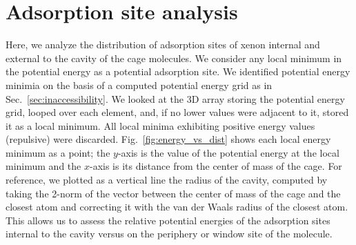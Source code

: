 \documentclass[journal=jacsat,manuscript=article]{achemso}
\begin{document}
\clearpage
\newpage


\section{Adsorption site analysis}
Here, we analyze the distribution of adsorption sites of xenon internal and external to the cavity of the cage molecules. We consider any local minimum in the potential energy as a potential adsorption site. We identified potential energy minimia on the basis of a computed potential energy grid as in Sec.~\ref{sec:inaccessibility}. We looked at the 3D array storing the potential energy grid, looped over each element, and, if no lower values were adjacent to it, stored it as a local minimum. All local minima exhibiting positive energy values (repulsive) were discarded. 
Fig.~\ref{fig:energy_vs_dist} shows each local energy minimum as a point; the $y$-axis is the value of the potential energy at the local minimum and the $x$-axis is its distance from the center of mass of the cage. For reference, we plotted as a vertical line the radius of the cavity, computed by taking the 2-norm of the vector between the center of mass of the cage and the closest atom and correcting it with the van der Waals radius of the closest atom. This allows us to assess the relative potential energies of the adsorption sites internal to the cavity versus on the periphery or window site of the molecule.
\end{document}

